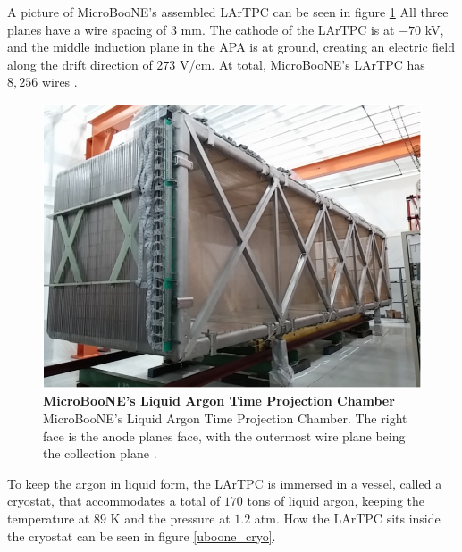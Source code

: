 %
A picture of MicroBooNE's assembled LArTPC can be seen in figure \ref{uboone_lartpc} All three planes have a wire spacing of $3$ mm. The cathode of the LArTPC is at $-70$ kV, and the middle induction plane in the APA is at ground, creating an electric field along the drift direction of $273$ V/cm. At total, MicroBooNE's LArTPC has $8,256$ wires \cite{microboone_design}. 
%
\begin{figure}[h!]
	\begin{center}
		\includegraphics[scale=0.6]{Figures/uboone_LArTPC.png}
		\caption[MicroBooNE's Liquid Argon Time Projection Chamber]{{\textbf{MicroBooNE's Liquid Argon Time Projection Chamber}} \\MicroBooNE's Liquid Argon Time Projection Chamber. The right face is the anode planes face, with the outermost wire plane being the collection plane \cite{microboone_design}.}
		\label{uboone_lartpc}	
	\end{center}
\end{figure}
%
To keep the argon in liquid form, the LArTPC is immersed in a vessel, called a cryostat, that accommodates a total of $170$ tons of liquid argon, keeping the temperature at $89$ K and the pressure at $1.2$ atm. How the LArTPC sits inside the cryostat can be seen in figure \ref{uboone_cryo}.
%

